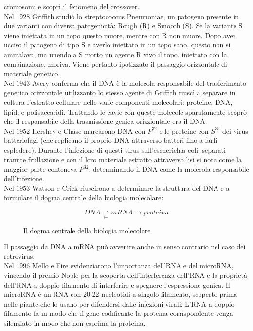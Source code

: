 cromosomi e scopr\`i il fenomeno del crossover.\\
Nel $1928$ Griffith studi\`o lo streptococcus Pneumoniae, un patogeno presente in due varianti con diversa patogenicit\`a: Rough (R) e Smooth (S). Se la variante S viene iniettata in un
topo questo muore, mentre con R non muore. Dopo aver ucciso il patogeno di tipo S e averlo iniettato in un topo sano, questo non si ammalava, ma unendo a S morto un agente R vivo il 
topo, iniettato con la combinazione, moriva. Viene pertanto ipotizzato il passaggio orizzontale di materiale genetico.\\
Nel $1943$ Avery conferma che il DNA \`e la molecola responsabile del trasferimento genetico orizzontale utilizzanto lo stesso agente di Griffith riusc\`i a separare in coltura 
l'estratto cellulare nelle varie componenti molecolari: proteine, DNA, lipidi e polisaccaridi. Trattando le cavie con queste molecole sparatamente scopr\`o che il responsabile della
trasmissione genica orizziontale era il DNA.\\
Nel $1952$ Hershey e Chase marcarono DNA con $P^{32}$ e le proteine con $S^{35}$ dei virus batteriofagi (che replicano il proprio DNA attraverso batteri fino a farli esplodere). Durante
l'infezione di questi virus sull'escherichia coli, separati tramite frullazione e con il loro materiale estratto attraverso lisi si nota come la maggior parte conteneva $P^{32}$, 
determinando il DNA come la molecola responsabile dell'infezione.\\
Nel $1953$ Watson e Crick riuscirono a determinare la struttura del DNA e a formulare il dogma centrale della biologia molecolare:
\begin{figure}[h]
\begin{equation*}
DNA\xrightarrow[\leftarrow]{}mRNA\rightarrow proteina
\end{equation*}
\caption{Il dogma centrale della biologia molecolare}
\end{figure}
Il passaggio da DNA a mRNA pu\`o avvenire anche in senso contrario nel caso dei retrovirus.\\
Nel $1996$ Mello e Fire evidenziarono l'importanza dell'RNA e del microRNA, vincendo il premio Noble per la scoperta dell'interferenza dell'RNA e la propriet\`a dell'RNA a doppio
filamento di interferire e spegnere l'espressione genica. Il microRNA \`e un RNA con 20-22 nucleotidi a singolo filamento, scoperto prima nelle piante che lo usano per difendersi dalle
infezioni virali. L'RNA a doppio filamento fa in modo che il gene codificante la proteina corrispondente venga silenziato in modo che non esprima la proteina.
